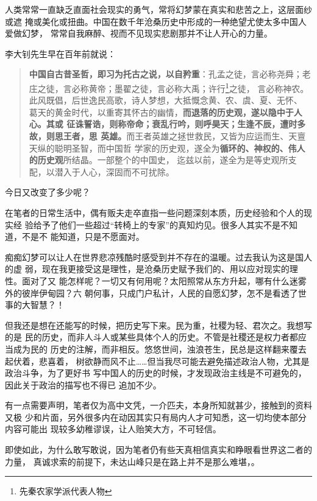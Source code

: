 
人类常常一直缺乏直面社会现实的勇气，常将幻梦蒙在真实和悲苦之上，这层面纱或遮
掩或美化或扭曲。中国在数千年沧桑历史中形成的一种绝望尤使太多中国人爱做幻梦，
常常自我麻醉、视而不见现实悲剧那并不让人开心的力量。

李大钊先生早在百年前就说：
\begin{quotation}
  \textbf{中国自古昔圣哲，即习为托古之说，以自矜重}：孔孟之徒，言必称尧舜；老
  庄之徒，言必称黄帝；墨翟之徒，言必称大禹；许行\footnote{先秦农家学派代表人物}之徒，
  言必称神农。此风既倡，后世逸民高歌，诗人梦想，大抵慨念黄、农、虞、夏、无怀、
  葛天的黄金时代，以重寄其怀古的幽情，\textbf{而退落的历史观，遂以隐中于人心。其或
    征诛誓诰，则称帝命；衰乱行吟，则呼昊天；生逢不辰，遭时多故，则思王者，思
    英雄。}而王者英雄之拯世救民，又皆为应运而生、天亶天纵的聪明圣智，而中国哲
  学家的历史观，遂全为\textbf{循环的、神权的、伟人的历史观}所结晶。一部整个的中国史，
  迄兹以前，遂全为是等史观所支配，以潜入于人心，深固而不可扰除。
\end{quotation}

今日又改变了多少呢？

在笔者的日常生活中，偶有贩夫走卒直指一些问题深刻本质，历史经验和个人的现实经
验给予了他们一些超过“转椅上的专家”的真知灼见。很多人其实不是不知道，不是不
能知道，只是不愿面对。

痴痴幻梦可以让人在世界悲凉残酷时感受到并不存在的温暖。过去我认为这是国人的虚
弱，现在我更接受这是理性，是沧桑历史赋予我们的、用以应对现实的理性。面对了又
能怎样呢？一切又有何用呢？太阳照常从东方升起，哪有什么迷雾外的彼岸伊甸园？六
朝何事，只成门户私计，人民的自愿幻梦，怎不是看透了世事的大智慧？！

但我还是想在还能写的时候，把历史写下来。民为重，社稷为轻、君次之。我想写的是
民的历史，而非人斗人或某些具体个人的历史。不管是社稷还是权力者都应当成为民的
历史的注解，而非相反。悠悠世间，浊浪苍生，民总是这样翻来覆去起伏着，悲喜着，
树欲静而风不止……但当我尽可能去避免描述政治人物，尤其是政治斗争，为了更好书
写中国人的历史的时候，才发现政治主线是不可避免的，因此关于政治的描写也不得已
追加不少。

有一点需要声明，笔者仅为高中文凭，一介匹夫，本身所知就甚少，接触到的资料又极
少和片面，另外很多内在动因其实只有局内人才可知悉，这一切均使本部分内容可能出
现较多幼稚谬误，让人贻笑大方，不可轻信。

即使如此，为什么敢写敢说，因为笔者仍有些天真相信真实和睁眼看世界这二者的力量，
真诚求索的前提下，未达山峰只是在路上并不是那么难堪，。

